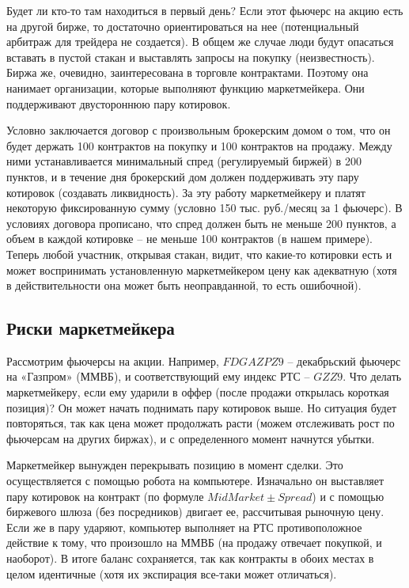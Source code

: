 \documentclass{article}
\begin{document}
Будет ли кто-то там находиться в первый день? Если этот фьючерс на акцию есть на другой бирже, то достаточно ориентироваться на нее (потенциальный арбитраж для трейдера не создается). В общем же случае люди будут опасаться вставать в пустой стакан и выставлять запросы на покупку (неизвестность). Биржа же, очевидно, заинтересована в торговле контрактами. Поэтому она нанимает организации, которые выполняют функцию маркетмейкера. Они поддерживают двустороннюю пару котировок. 

Условно заключается договор с произвольным брокерским домом о том, что он будет держать 100 контрактов на покупку и 100 контрактов на продажу. Между ними устанавливается минимальный спред (регулируемый биржей) в 200 пунктов, и в течение дня брокерский дом должен поддерживать эту пару котировок (создавать ликвидность). За эту работу маркетмейкеру и платят некоторую фиксированную сумму (условно 150 тыс. руб./месяц за 1 фьючерс). В условиях договора прописано, что спред должен быть не меньше 200 пунктов, а объем в каждой котировке – не меньше 100 контрактов (в нашем примере). Теперь любой участник, открывая стакан, видит, что какие-то котировки есть и может воспринимать установленную маркетмейкером цену как адекватную (хотя в действительности она может быть неоправданной, то есть ошибочной). 
\subsection{Риски маркетмейкера}

Рассмотрим фьючерсы на акции. Например, $ FDGAZPZ9 $ – декабрьский фьючерс на «Газпром» (ММВБ), и соответствующий ему индекс РТС – $ GZZ9 $. Что делать маркетмейкеру, если ему ударили в оффер (после продажи открылась короткая позиция)? Он может начать поднимать пару котировок выше. Но ситуация будет повторяться, так как цена может продолжать расти (можем отслеживать рост по фьючерсам на других биржах), и с определенного момент начнутся убытки. 

Маркетмейкер вынужден перекрывать позицию в момент сделки. Это осуществляется с помощью робота на компьютере. Изначально он выставляет пару котировок на контракт (по формуле $ MidMarket \pm Spread $) и с помощью биржевого шлюза (без посредников) двигает ее, рассчитывая рыночную цену. Если же в пару ударяют, компьютер выполняет на РТС противоположное действие к тому, что произошло на ММВБ (на продажу отвечает покупкой, и наоборот). В итоге баланс сохраняется, так как контракты в обоих местах в целом идентичные (хотя их экспирация все-таки может отличаться). 
\end{document}
